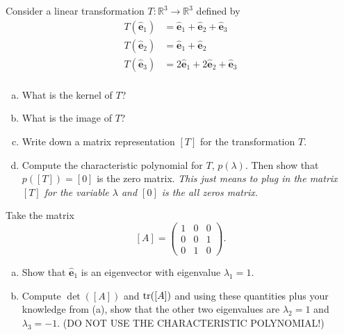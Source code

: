 \documentclass[12pt]{amsbook}
\newcommand{\R}{\mathbb{R}}
\newcommand{\ehat}{\boldsymbol{\hat{e}}}
\begin{document}
%

\newpage
\begin{problem}
Consider a linear transformation $T\colon \R^3 \to \R^3$ defined by
\begin{align*}
T(\ehat_1) &= \ehat_1 + \ehat_2 + \ehat_3\\
T(\ehat_2) &= \ehat_1 + \ehat_2\\
T(\ehat_3) &= 2\ehat_1 + 2\ehat_2 + \ehat_3\\
\end{align*}
\begin{enumerate}[(a)]
    \item What is the kernel of $T$?
    \item What is the image of $T$?
    \item Write down a matrix representation $[T]$ for the transformation $T$.
    \item Compute the characteristic polynomial for $T$, $p(\lambda)$. Then show that $p([T])=[0]$ is the zero matrix. \emph{This just means to plug in the matrix $[T]$ for the variable $\lambda$ and $[0]$ is the all zeros matrix.}
\end{enumerate}
\end{problem}


\newpage
\begin{problem}
Take the matrix
\[
[A] = \begin{pmatrix} 1 & 0 & 0 \\ 0 & 0 & 1 \\ 0 & 1 & 0 \end{pmatrix}.
\]
\begin{enumerate}[(a)]
    \item Show that $\ehat_1$ is an eigenvector with eigenvalue $\lambda_1=1$.
    \item Compute $\det([A])$ and $\mathrm{tr}([A])$ and using these quantities plus your knowledge from (a), show that the other two eigenvalues are $\lambda_2 = 1$ and $\lambda_3 = -1$. (DO NOT USE THE CHARACTERISTIC POLYNOMIAL!)
\end{enumerate}
\end{problem}
\end{document}
